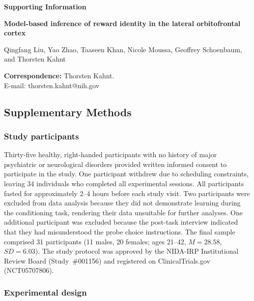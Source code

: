 \documentclass[12pt,letterpaper]{article}
\begin{document}
\raggedright

\begin{center}

{\large\bfseries Supporting Information\par}\medskip

{\Large\bfseries Model-based inference of reward identity in the lateral orbitofrontal cortex\par}

\medskip

Qingfang Liu, Yao Zhao, Taaseen Khan, Nicole Moussa, Geoffrey Schoenbaum, and Thorsten Kahnt\par

\medskip

\end{center}


\noindent\textbf{Correspondence:} Thorsten Kahnt.\\E-mail: thorsten.kahnt@nih.gov

\renewcommand{\thefigure}{S\arabic{figure}}
\renewcommand{\thetable}{S\arabic{table}}

\subsection*{Supplementary Methods}

\subsubsection*{Study participants}

Thirty-five healthy, right-handed participants with no history of major psychiatric or neurological disorders provided written informed consent to participate in the study. One participant withdrew due to scheduling constraints, leaving 34 individuals who completed all experimental sessions. All participants fasted for approximately 2–4 hours before each study visit. Two participants were excluded from data analysis because they did not demonstrate learning during the conditioning task, rendering their data unsuitable for further analyses. One additional participant was excluded because the post-task interview indicated that they had misunderstood the probe choice instructions. The final sample comprised 31 participants (11 males, 20 females; ages 21–42, $M = 28.58$, $SD = 6.03$). The study protocol was approved by the NIDA-IRP Institutional Review Board (Study~\#001156) and registered on ClinicalTrials.gov (NCT05707806).

\subsubsection*{Experimental design}
\end{document}
